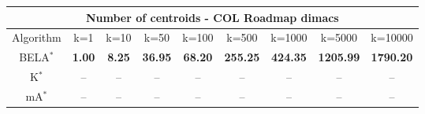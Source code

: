 \begin{tabular}{c|cccccccc}\toprule
\multicolumn{9}{c}{Number of centroids - COL Roadmap dimacs}\\ \midrule
Algorithm & k=1 & k=10 & k=50 & k=100 & k=500 & k=1000 & k=5000 & k=10000 \\ \midrule
BELA$^*$ & \textbf{1.00} & \textbf{8.25} & \textbf{36.95} & \textbf{68.20} & \textbf{255.25} & \textbf{424.35} & \textbf{1205.99} & \textbf{1790.20} \\
K$^*$ & -- & -- & -- & -- & -- & -- & -- & -- \\
mA$^*$ & -- & -- & -- & -- & -- & -- & -- & -- \\ \bottomrule 
\end{tabular}
